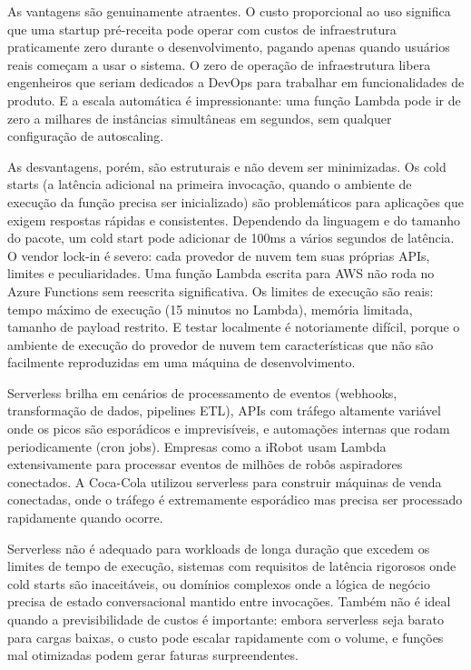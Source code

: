 As vantagens são genuinamente atraentes. O custo proporcional ao uso significa
que uma startup pré-receita pode operar com custos de infraestrutura
praticamente zero durante o desenvolvimento, pagando apenas quando usuários
reais começam a usar o sistema. O zero de operação de infraestrutura libera
engenheiros que seriam dedicados a DevOps para trabalhar em funcionalidades de
produto. E a escala automática é impressionante: uma função Lambda pode ir de
zero a milhares de instâncias simultâneas em segundos, sem qualquer configuração
de autoscaling.

As desvantagens, porém, são estruturais e não devem ser minimizadas. Os cold
starts (a latência adicional na primeira invocação, quando o ambiente de
execução da função precisa ser inicializado) são problemáticos para
aplicações que exigem respostas rápidas e consistentes. Dependendo da
linguagem e do tamanho do pacote, um cold start pode adicionar de 100ms a
vários segundos de latência. O vendor lock-in é severo: cada provedor de
nuvem tem suas próprias APIs, limites e peculiaridades. Uma função Lambda
escrita para AWS não roda no Azure Functions sem reescrita significativa.
Os limites de execução são reais: tempo máximo de execução (15 minutos no
Lambda), memória limitada, tamanho de payload restrito. E testar localmente
é notoriamente difícil, porque o ambiente de execução do provedor de nuvem
tem características que não são facilmente reproduzidas em uma máquina de
desenvolvimento.

Serverless brilha em cenários de processamento de eventos (webhooks,
transformação de dados, pipelines ETL), APIs com tráfego altamente variável
onde os picos são esporádicos e imprevisíveis, e automações internas que
rodam periodicamente (cron jobs). Empresas como a iRobot usam Lambda
extensivamente para processar eventos de milhões de robôs aspiradores
conectados. A Coca-Cola utilizou serverless para construir máquinas de venda
conectadas, onde o tráfego é extremamente esporádico mas precisa ser processado
rapidamente quando ocorre.

Serverless não é adequado para workloads de longa duração que excedem os
limites de tempo de execução, sistemas com requisitos de latência rigorosos
onde cold starts são inaceitáveis, ou domínios complexos onde a lógica de
negócio precisa de estado conversacional mantido entre invocações. Também não
é ideal quando a previsibilidade de custos é importante: embora serverless
seja barato para cargas baixas, o custo pode escalar rapidamente com o
volume, e funções mal otimizadas podem gerar faturas surpreendentes.

